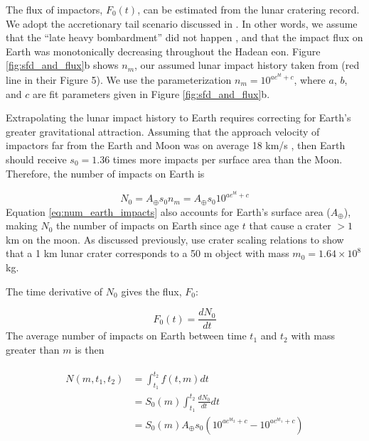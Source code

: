 \documentclass[manuscript]{aastex63}
\begin{document}
The flux of impactors, $F_0(t)$, can be estimated from the lunar cratering record. We adopt the accretionary tail scenario discussed in \citet{Morbidelli_2018}. In other words, we assume that the ``late heavy bombardment'' did not happen \citep{Cartwright_2022,Hartmann_2019,Zellner_2017}, and that the impact flux on Earth was monotonically decreasing throughout the Hadean eon. Figure \ref{fig:sfd_and_flux}b shows $n_m$, our assumed lunar impact history taken from \citet{Morbidelli_2018} (red line in their Figure 5). We use the parameterization $n_m = 10^{a e^{b t} + c}$, where $a$, $b$, and $c$ are fit parameters given in Figure \ref{fig:sfd_and_flux}b.

Extrapolating the lunar impact history to Earth requires correcting for Earth's greater gravitational attraction. Assuming that the approach velocity of impactors far from the Earth and Moon was on average 18 km/s \citep{Morbidelli_2018}, then Earth should receive $s_0 = 1.36$ times more impacts per surface area than the Moon. Therefore, the number of impacts on Earth is

\begin{equation}
  N_0 = A_\oplus s_0 n_m = A_\oplus s_0 10^{a e^{b t} + c}
  \label{eq:num_earth_impacts}
\end{equation}
Equation \eqref{eq:num_earth_impacts} also accounts for Earth's surface area ($A_\oplus$), making $N_0$ the number of impacts on Earth since age $t$ that cause a crater $> 1$ km on the moon. As discussed previously, \citet{Morbidelli_2018} use crater scaling relations to show that a 1 km lunar crater corresponds to a 50 m object with mass $m_0 = 1.64 \times 10^8$ kg.

The time derivative of $N_0$ gives the flux, $F_0$:

\begin{equation}
  F_0(t) = \frac{d N_0}{dt}
\end{equation}
The average number of impacts on Earth between time $t_1$ and $t_2$ with mass greater than $m$ is then

\begin{align}
\begin{split}
  N(m,t_1,t_2) &= \int_{t_1}^{t_2} f(t,m) dt \\
  &= S_0(m) \int_{t_1}^{t_2} \frac{d N_0}{dt} dt \\
  &= S_0(m) A_\oplus s_0 \left( 10^{a e^{b t_2} + c} - 10^{a e^{b t_1} + c} \right)
\end{split}
\end{align}
\end{document}
